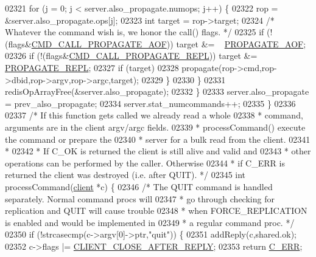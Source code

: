 \begin{DoxyCode}
{{{{{{{{{{{{{{{{{{{{{{{{{{{{{02321             \textcolor{keywordflow}{for} (j = 0; j < server.also\_propagate.numops; j++) \{
02322                 rop = &server.also\_propagate.ops[j];
02323                 \textcolor{keywordtype}{int} target = rop->target;
02324                 \textcolor{comment}{/* Whatever the command wish is, we honor the call() flags. */}
02325                 \textcolor{keywordflow}{if} (!(flags&\hyperlink{server_8h_a3ca848c94df18641ac372c58fca0e236}{CMD\_CALL\_PROPAGATE\_AOF})) target &= ~
      \hyperlink{server_8h_a542fb79924ca427c866fd63632f60777}{PROPAGATE\_AOF};
02326                 \textcolor{keywordflow}{if} (!(flags&\hyperlink{server_8h_a69e4a8fdb26588e1028deb20fd51424a}{CMD\_CALL\_PROPAGATE\_REPL})) target &= ~
      \hyperlink{server_8h_a59c6e025b4ed85642a0472fc3e73e298}{PROPAGATE\_REPL};
02327                 \textcolor{keywordflow}{if} (target)
02328                     propagate(rop->cmd,rop->dbid,rop->argv,rop->argc,target);
02329             \}
02330         \}
02331         redisOpArrayFree(&server.also\_propagate);
02332     \}
02333     server.also\_propagate = prev\_also\_propagate;
02334     server.stat\_numcommands++;
02335 \}
02336 
02337 \textcolor{comment}{/* If this function gets called we already read a whole}
02338 \textcolor{comment}{ * command, arguments are in the client argv/argc fields.}
02339 \textcolor{comment}{ * processCommand() execute the command or prepare the}
02340 \textcolor{comment}{ * server for a bulk read from the client.}
02341 \textcolor{comment}{ *}
02342 \textcolor{comment}{ * If C\_OK is returned the client is still alive and valid and}
02343 \textcolor{comment}{ * other operations can be performed by the caller. Otherwise}
02344 \textcolor{comment}{ * if C\_ERR is returned the client was destroyed (i.e. after QUIT). */}
02345 \textcolor{keywordtype}{int} processCommand(\hyperlink{structclient}{client} *c) \{
02346     \textcolor{comment}{/* The QUIT command is handled separately. Normal command procs will}
02347 \textcolor{comment}{     * go through checking for replication and QUIT will cause trouble}
02348 \textcolor{comment}{     * when FORCE\_REPLICATION is enabled and would be implemented in}
02349 \textcolor{comment}{     * a regular command proc. */}
02350     \textcolor{keywordflow}{if} (!strcasecmp(c->argv[0]->ptr,\textcolor{stringliteral}{"quit"})) \{
02351         addReply(c,shared.ok);
02352         c->flags |= \hyperlink{server_8h_a8cff2154afcc2e87ac85bdbbe2814091}{CLIENT\_CLOSE\_AFTER\_REPLY};
02353         \textcolor{keywordflow}{return} \hyperlink{server_8h_af98ac28d5f4d23d7ed5985188e6fb7d1}{C\_ERR};
}}}}}}}}}}}}}}}}}}}}}}}}}}}}}
\end{DoxyCode}
